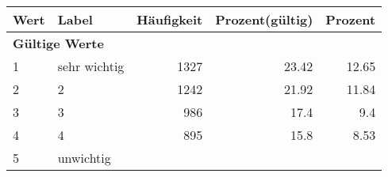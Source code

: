      \begin{longtable}{lXrrr}
     \toprule
     \textbf{Wert} & \textbf{Label} & \textbf{Häufigkeit} & \textbf{Prozent(gültig)} & \textbf{Prozent} \\
     \endhead
     \midrule
     \multicolumn{5}{l}{\textbf{Gültige Werte}}\\

     1 &
     \multicolumn{1}{X}{ sehr wichtig   } &


       \num{1327} &
       \num[round-mode=places,round-precision=2]{23.42} &
         \num[round-mode=places,round-precision=2]{12.65} \\

     2 &
     \multicolumn{1}{X}{ 2   } &


       \num{1242} &
       \num[round-mode=places,round-precision=2]{21.92} &
         \num[round-mode=places,round-precision=2]{11.84} \\

     3 &
     \multicolumn{1}{X}{ 3   } &


       \num{986} &
       \num[round-mode=places,round-precision=2]{17.4} &
         \num[round-mode=places,round-precision=2]{9.4} \\

     4 &
     \multicolumn{1}{X}{ 4   } &


       \num{895} &
       \num[round-mode=places,round-precision=2]{15.8} &
         \num[round-mode=places,round-precision=2]{8.53} \\

     5 &
     \multicolumn{1}{X}{ unwichtig   } &



\end{longtable}

